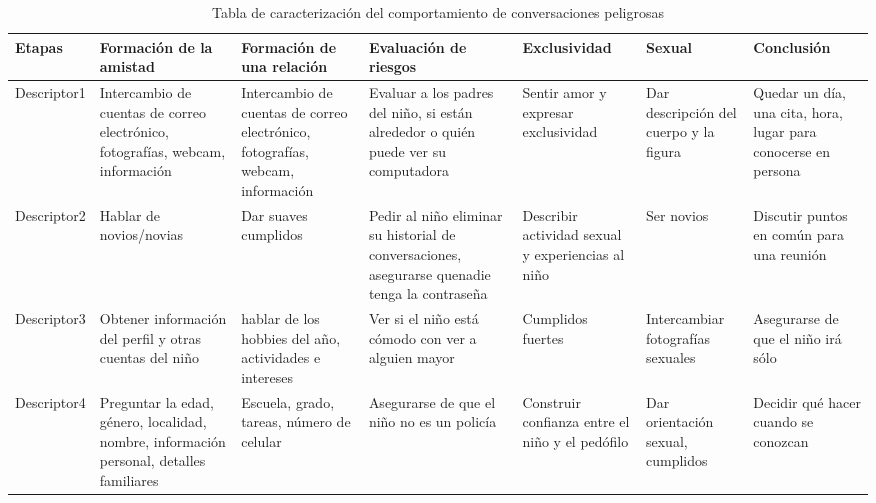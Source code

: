 \begin{table}[!h]

\begin{tabular}[t]{|p{15mm} |p{22mm} |p{22mm} |p{22mm} |p{20mm} |p{20mm} |p{20mm} |}
\hline
\hline
Etapas & Formaci\'on de la amistad & Formaci\'on de una relaci\'on & Evaluaci\'on de riesgos & Exclusividad & Sexual & Conclusi\'on \\
\hline
Descriptor1 & Intercambio de cuentas de correo electr\'onico, fotograf\'ias, webcam, informaci\'on & Intercambio de cuentas de correo electr\'onico, fotograf\'ias, webcam, informaci\'on & Evaluar a los padres del ni\~no, si est\'an alrededor o qui\'en puede ver su computadora & Sentir amor y expresar exclusividad & Dar descripci\'on del cuerpo y la figura & Quedar un d\'ia, una cita, hora, lugar para conocerse en persona \\
\hline
Descriptor2 &Hablar de novios/novias & Dar suaves cumplidos & Pedir al ni\~no eliminar su historial de conversaciones, asegurarse quenadie tenga la contrase\~na & Describir actividad sexual y experiencias al ni\~no &Ser novios &Discutir puntos en com\'un para una reuni\'on \\
\hline
Descriptor3 &Obtener informaci\'on del perfil y otras cuentas del ni\~no & hablar de los hobbies del a\~no, actividades e intereses & Ver si el ni\~no est\'a c\'omodo con ver a alguien mayor& Cumplidos fuertes & Intercambiar fotograf\'ias sexuales & Asegurarse de que el ni\~no ir\'a s\'olo \\
\hline
Descriptor4 & Preguntar la edad, g\'enero, localidad, nombre, informaci\'on personal, detalles familiares & Escuela, grado, tareas, n\'umero de celular & Asegurarse de que el ni\~no no es un polic\'ia & Construir confianza entre el ni\~no y el ped\'ofilo & Dar orientaci\'on sexual, cumplidos & Decidir qu\'e hacer cuando se conozcan\\
\hline
\end{tabular} \\ \\ \\
\caption{Tabla de caracterizaci\'on del comportamiento de conversaciones peligrosas}
\label{table:caracterizacion}
\end{table}






